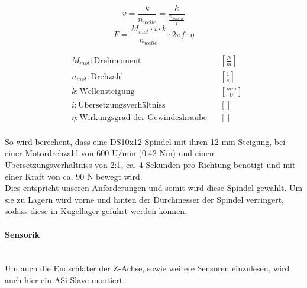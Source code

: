 \vspace{5mm}
\noindent\begin{minipage}{\textwidth}
\begin{minipage}[t]{0.5\textwidth}
    \begin{equation*}
        v = \frac{k}{n_{welle}} = \frac{k}{\frac{n_{motor}}{i}}
    \end{equation*}
    \begin{equation*}
        F = \frac{M_{mot} \cdot i \cdot k}{n_{welle}} \cdot 2 \pi f \cdot \eta 
    \end{equation*}
\end{minipage}%
\begin{minipage}[t]{0.5\textwidth}
    \vspace{-7mm}
    \begin{align*}
        &M_{mot}: \text{Drehmoment} & &\left[\frac{N}{m}\right]\\
        &n_{mot}: \text{Drehzahl} & &\left[\frac{1}{s}\right]\\
        &k: \text{Wellensteigung} & &\left[\frac{mm}{U}\right]\\
        &i: \text{Übersetzungsverhältniss} & &\left[\right]\\
        &\eta: \text{Wirkungsgrad der Gewindeshraube} & &\left[\right]\\
    \end{align*}
\end{minipage}
\end{minipage}

\vspace{5mm}

So wird berechent, dass eine DS10x12 Spindel mit ihren 12 mm Steigung, bei einer Motordrehzahl von 600 U/min (0.42 Nm) und einem Übersetzungsverhältniss von 2:1, ca. 4 Sekunden pro Richtung benötigt und mit einer Kraft von ca. 90 N bewegt wird. \\Dies entspricht unseren Anforderungen und somit wird diese Spindel gewählt. Um sie zu Lagern wird vorne und hinten der Durchmesser der Spindel verringert, sodass diese in Kugellager geführt werden können.

\paragraph{Sensorik}\mbox{}\\
Um auch die Endschlater der Z-Achse, sowie weitere Sensoren einzulesen, wird auch hier ein ASi-Slave montiert.


